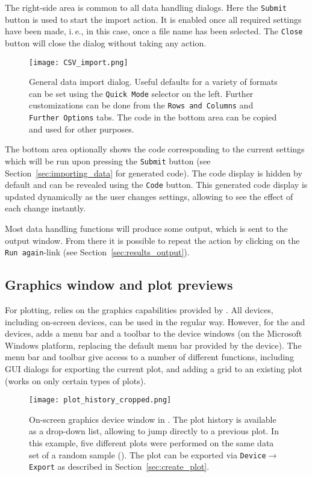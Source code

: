 The right-side area is common to all data handling
dialogs. Here the \texttt{Submit} button is used
to start the import action. It is enabled once all required
settings have been made, i.\,e., in this case, once a file name has been
selected. The \texttt{Close} button will close the
dialog without taking any action.

\begin{figure}[t!]
 \centering
 \texttt{[image: CSV\_import.png]}
 \caption{General data import dialog. Useful defaults for a variety of formats can
  be set using the \texttt{Quick Mode} selector on the left. Further customizations can be done
  from the \texttt{Rows and Columns} and \texttt{Further Options} tabs. The 
  code in the bottom area can be copied and used for other purposes.}
 \label{fig:CSV_import}
\end{figure}

The bottom area optionally shows the 
code corresponding to the current settings  which will be run
upon pressing the \texttt{Submit} button (see Section~\ref{sec:importing_data} for generated  code). 
The code display is hidden by default and can be revealed using
the \texttt{Code} button. This 
generated code display is updated dynamically as the user changes settings, allowing
to see the effect of each change instantly.

Most data handling functions will produce some output, which is
sent to the output window. From there it is possible to repeat the
action by clicking on the \texttt{Run again}-link
(see Section~\ref{sec:results_output}).

\subsection{Graphics window and plot previews}
\label{sec:plot_previews}

For plotting,  relies on the graphics capabilities provided by
. All 
devices, including on{}-screen devices, can be used in the regular way.
However, for the  and  devices,  adds a menu
bar and a toolbar to the device windows (on the Microsoft Windows platform,
replacing the default menu bar provided by the device). The menu
bar and toolbar give access to a number of different functions,
including GUI dialogs for exporting the current plot,
and adding a grid to an existing plot 
(works on only certain types of plots).

\begin{figure}[b!]
 \centering
 \texttt{[image: plot\_history\_cropped.png]}
 \caption{On{}-screen graphics device window in . The plot history is 
  available as a drop-down list, allowing to jump directly to a previous 
  plot. In this example, five different plots were performed on the same data 
  set of a random sample (). The plot can be 
  exported via \texttt{Device$\rightarrow$Export} as described in Section~\ref{sec:create_plot}.
}
 \label{fig:plot_history}
\end{figure}

